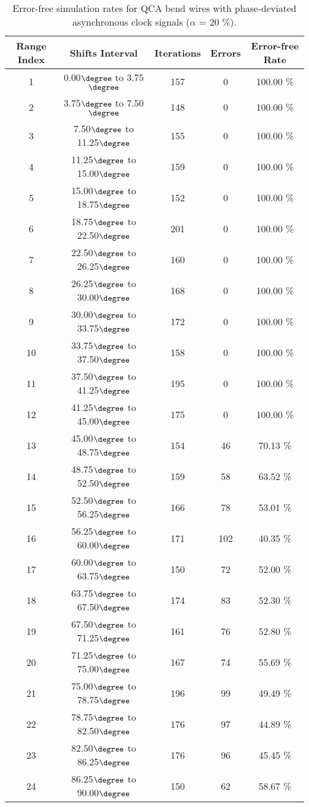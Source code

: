 \flushleft
\begin{table}[h]
\begin{center}
\caption{Error-free simulation rates for QCA bend wires with phase-deviated asynchronous clock signals ($\alpha$ = 20 \%).}
\begin{tabular}{|c|c|c|c|c|}
\hline
\textbf{Range Index} & \textbf{Shifts Interval} & \textbf{Iterations} & \textbf{Errors} & \textbf{Error-free Rate} \\
\hline
1  &  0.00$\degree$ to  3.75$\degree$ & 157 &  0 & 100.00 \% \\
\hline
2  &  3.75$\degree$ to  7.50$\degree$ & 148 &  0 & 100.00 \% \\
\hline
3  &  7.50$\degree$ to 11.25$\degree$ & 155 &  0 & 100.00 \% \\
\hline
4  & 11.25$\degree$ to 15.00$\degree$ & 159 &  0 & 100.00 \% \\
\hline
5  & 15.00$\degree$ to 18.75$\degree$ & 152 &  0 & 100.00 \% \\
\hline
6  & 18.75$\degree$ to 22.50$\degree$ & 201 &  0 & 100.00 \% \\
\hline
7  & 22.50$\degree$ to 26.25$\degree$ & 160 &  0 & 100.00 \% \\
\hline
8  & 26.25$\degree$ to 30.00$\degree$ & 168 &  0 & 100.00 \% \\
\hline
9  & 30.00$\degree$ to 33.75$\degree$ & 172 &  0 & 100.00 \% \\
\hline
10 & 33.75$\degree$ to 37.50$\degree$ & 158 &  0 & 100.00 \% \\
\hline
11 & 37.50$\degree$ to 41.25$\degree$ & 195 &  0 & 100.00 \% \\
\hline
12 & 41.25$\degree$ to 45.00$\degree$ & 175 &  0 & 100.00 \% \\
\hline
13 & 45.00$\degree$ to 48.75$\degree$ & 154 & 46 &  70.13 \% \\
\hline
14 & 48.75$\degree$ to 52.50$\degree$ & 159 & 58 &  63.52 \% \\
\hline
15 & 52.50$\degree$ to 56.25$\degree$ & 166 & 78 &  53.01 \% \\
\hline
16 & 56.25$\degree$ to 60.00$\degree$ & 171 & 102 &  40.35 \% \\
\hline
17 & 60.00$\degree$ to 63.75$\degree$ & 150 & 72 &  52.00 \% \\
\hline
18 & 63.75$\degree$ to 67.50$\degree$ & 174 & 83 &  52.30 \% \\
\hline
19 & 67.50$\degree$ to 71.25$\degree$ & 161 & 76 &  52.80 \% \\
\hline
20 & 71.25$\degree$ to 75.00$\degree$ & 167 & 74 &  55.69 \% \\
\hline
21 & 75.00$\degree$ to 78.75$\degree$ & 196 & 99 &  49.49 \% \\
\hline
22 & 78.75$\degree$ to 82.50$\degree$ & 176 & 97 &  44.89 \% \\
\hline
23 & 82.50$\degree$ to 86.25$\degree$ & 176 & 96 &  45.45 \% \\
\hline
24 & 86.25$\degree$ to 90.00$\degree$ & 150 & 62 &  58.67 \% \\
\hline


\end{tabular}
\end{center}
\end{table}
